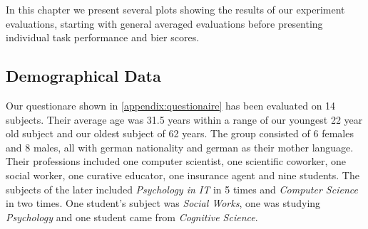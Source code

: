 \documentclass[../main/main.tex]{subfiles}
\begin{document}
In this chapter we present several plots showing the results of our experiment evaluations, starting with general averaged evaluations before presenting individual task performance and bier scores.
\subsection{Demographical Data}
Our questionare shown in \ref{appendix:questionaire} has been evaluated on 14 subjects. Their average age was 31.5 years within a range of our youngest 22 year old subject and our oldest subject of 62 years. The group consisted of 6 females and 8 males, all with german nationality and german as their mother language. Their professions included one computer scientist, one scientific coworker, one social worker, one curative educator, one insurance agent and nine students. The subjects of the later included \textit{Psychology in IT} in 5 times and \textit{Computer Science} in two times. One student's subject was \textit{Social Works}, one was studying \textit{Psychology} and one student came from \textit{Cognitive Science}.
\end{document}
